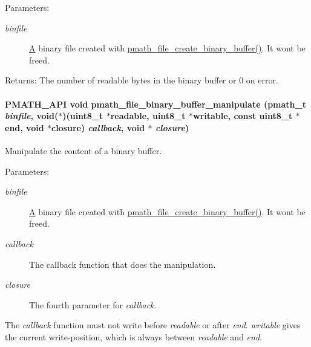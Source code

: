 \begin{Desc}
\item[Parameters:]
\begin{description}
\item[{\em binfile}]\hyperlink{class_a}{A} binary file created with \hyperlink{group__file__api_g811d829fe964ebbe554c645a0f0f519d}{pmath\_\-file\_\-create\_\-binary\_\-buffer()}. It wont be freed. \end{description}
\end{Desc}
\begin{Desc}
\item[Returns:]The number of readable bytes in the binary buffer or 0 on error. \end{Desc}
\hypertarget{group__file__api_g9c684b801f150b0485c850cf3649cb16}{
\paragraph[{pmath\_\-file\_\-binary\_\-buffer\_\-manipulate}]{\setlength{\rightskip}{0pt plus 5cm}PMATH\_\-API void pmath\_\-file\_\-binary\_\-buffer\_\-manipulate ({\bf pmath\_\-t} {\em binfile}, \/  void($\ast$)(uint8\_\-t $\ast$readable, uint8\_\-t $\ast$writable, const uint8\_\-t $\ast$end, void $\ast$closure) {\em callback}, \/  void $\ast$ {\em closure})}\hfill}
\label{group__file__api_g9c684b801f150b0485c850cf3649cb16}


Manipulate the content of a binary buffer. 

\begin{Desc}
\item[Parameters:]
\begin{description}
\item[{\em binfile}]\hyperlink{class_a}{A} binary file created with \hyperlink{group__file__api_g811d829fe964ebbe554c645a0f0f519d}{pmath\_\-file\_\-create\_\-binary\_\-buffer()}. It wont be freed. \item[{\em callback}]The callback function that does the manipulation. \item[{\em closure}]The fourth parameter for {\em callback\/}.\end{description}
\end{Desc}
The {\em callback\/} function must not write before {\em readable\/} or after {\em end\/}. {\em writable\/} gives the current write-position, which is always between {\em readable\/} and {\em end\/}. 